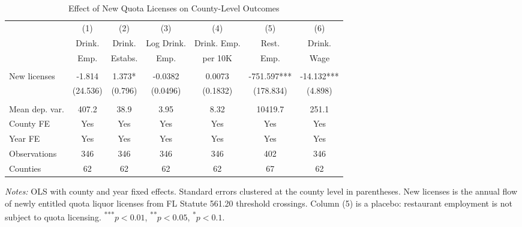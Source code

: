 \begin{table}[htbp]
\centering
\caption{Effect of New Quota Licenses on County-Level Outcomes}
\label{tab:main}
\begin{tabular}{lcccccc}
\hline\hline
 & (1) & (2) & (3) & (4) & (5) & (6) \\
 & Drink. & Drink. & Log Drink. & Drink. Emp. & Rest. & Drink. \\
 & Emp. & Estabs. & Emp. & per 10K & Emp. & Wage \\
\hline
\\[-1.8ex]
New licenses & -1.814 & 1.373* & -0.0382 & 0.0073 & -751.597*** & -14.132*** \\
 & (24.536) & (0.796) & (0.0496) & (0.1832) & (178.834) & (4.898) \\
\\[-1.8ex]
Mean dep. var. & 407.2 & 38.9 & 3.95 & 8.32 & 10419.7 & 251.1 \\
County FE & Yes & Yes & Yes & Yes & Yes & Yes \\
Year FE & Yes & Yes & Yes & Yes & Yes & Yes \\
Observations & 346 & 346 & 346 & 346 & 402 & 346 \\
Counties & 62 & 62 & 62 & 62 & 67 & 62 \\
\hline\hline
\end{tabular}
\begin{tablenotes}
\small
\item \textit{Notes:} OLS with county and year fixed effects. Standard errors clustered at the county level in parentheses. New licenses is the annual flow of newly entitled quota liquor licenses from FL Statute 561.20 threshold crossings. Column (5) is a placebo: restaurant employment is not subject to quota licensing. \textsuperscript{***}$p<0.01$, \textsuperscript{**}$p<0.05$, \textsuperscript{*}$p<0.1$.
\end{tablenotes}
\end{table}
